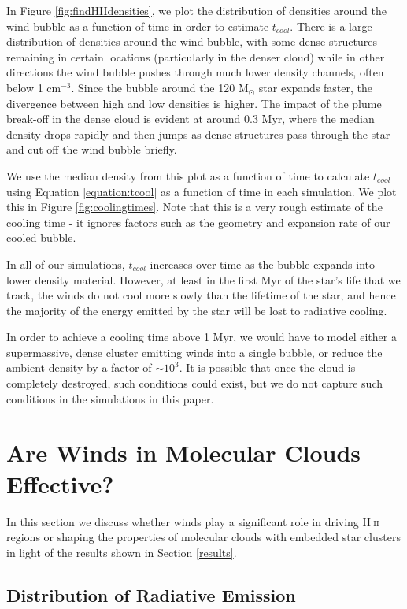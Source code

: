 \documentclass[a4paper,fleqn,usenatbib]{mnras}
\newcommand{\Msolar}{M$_{\odot}$\xspace}
\newcommand{\HII}{H$~$\textsc{ii}\xspace}
\begin{document}
 In Figure \ref{fig:findHIIdensities}, we plot the distribution of densities around the wind bubble as a function of time in order to estimate $t_{cool}$. There is a large distribution of densities around the wind bubble, with some dense structures remaining in certain locations (particularly in the denser cloud) while in other directions the wind bubble pushes through much lower density channels, often below 1 cm$^{-3}$. Since the bubble around the 120 \Msolar star expands faster, the divergence between high and low densities is higher. The impact of the plume break-off in the dense cloud is evident at around 0.3 Myr, where the median density drops rapidly and then jumps as dense structures pass through the star and cut off the wind bubble briefly.
 
 We use the median density from this plot as a function of time to calculate $t_{cool}$ using Equation \ref{equation:tcool} as a function of time in each simulation. We plot this in Figure \ref{fig:coolingtimes}. Note that this is a very rough estimate of the cooling time - it ignores factors such as the geometry and expansion rate of our cooled bubble.
 
 In all of our simulations, $t_{cool}$ increases over time as the bubble expands into lower density material. However, at least in the first Myr of the star's life that we track, the winds do not cool more slowly than the lifetime of the star, and hence the majority of the energy emitted by the star will be lost to radiative cooling.
 
 In order to achieve a cooling time above 1 Myr, we would have to model either a supermassive, dense cluster emitting winds into a single bubble, or reduce the ambient density by a factor of $\sim 10^3$. It is possible that once the cloud is completely destroyed, such conditions could exist, but we do not capture such conditions in the simulations in this paper.

\section{Are Winds in Molecular Clouds Effective?}
\label{effective}

In this section we discuss whether winds play a significant role in driving \HII regions or shaping the properties of molecular clouds with embedded star clusters in light of the results shown in Section \ref{results}.

\subsection{Distribution of Radiative Emission}
\label{effective:radiativeemission}
\end{document}
